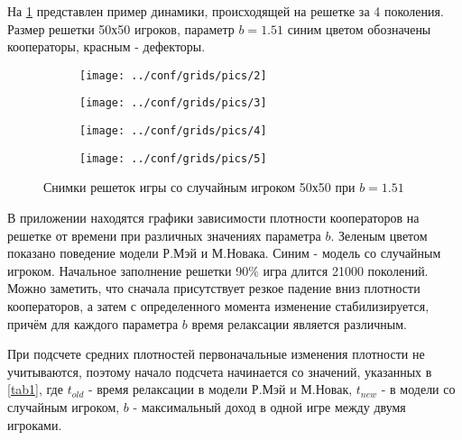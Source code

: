 \documentclass[12pt,a4paper]{article}
\begin{document}
	\par На \ref{fig:1} представлен пример динамики, происходящей на решетке за 4 поколения.
	Размер решетки 50х50 игроков, параметр $b=1.51$ синим цветом обозначены кооператоры, красным - дефекторы. 
	\begin{figure}[H]
		\centering
		\begin{subfigure}{.5\textwidth}
			\texttt{[image: ../conf/grids/pics/2]}
			\caption{}
		\end{subfigure}%
		\begin{subfigure}{.5\textwidth}
			\texttt{[image: ../conf/grids/pics/3]}
			\caption{}
		\end{subfigure}%
	
		\begin{subfigure}{.5\textwidth}
			\texttt{[image: ../conf/grids/pics/4]}
			\caption{}
		\end{subfigure}%
		\begin{subfigure}{.5\textwidth}
			\texttt{[image: ../conf/grids/pics/5]}
			\caption{}
		\end{subfigure}%
		\caption{Снимки решеток игры со случайным игроком 50х50 при $b=1.51$}
		\label{fig:1}
	\end{figure}
	
	В приложении находятся графики зависимости плотности кооператоров на решетке 
	от времени при различных значениях параметра $b$. Зеленым цветом показано поведение
	модели Р.Мэй и М.Новака. Синим - модель со случайным игроком. Начальное заполнение решетки 90$\%$ игра длится 21000 поколений. Можно заметить, что сначала присутствует резкое падение вниз плотности кооператоров, а затем с определенного момента изменение 
	стабилизируется, причём для каждого параметра $b$ время релаксации является различным.
	
	\par При подсчете средних плотностей первоначальные изменения плотности не учитываются, поэтому начало подсчета начинается со значений, указанных в \ref{tab1}, где $t_{old}$ - время релаксации в модели Р.Мэй и М.Новак,  $t_{new}$ - в модели со случайным игроком,
	$b$ - максимальный доход в одной игре между двумя игроками.
	
\end{document}
